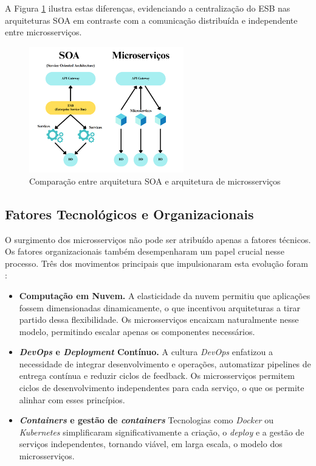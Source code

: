 A Figura \ref{fig:soa_microservicos} ilustra estas diferenças, evidenciando a centralização do ESB nas arquiteturas SOA em contraste com a comunicação distribuída e independente entre microsserviços.


\begin{figure}[H]
    \centering
    \includegraphics[width=0.6\textwidth]{images/Diagramas/soa_vs_microservicos.png}
    \caption{Comparação entre arquitetura SOA e arquitetura de microsserviços}
    \label{fig:soa_microservicos}
\end{figure}

\subsection{Fatores Tecnológicos e Organizacionais}

O surgimento dos microsserviços não pode ser atribuído apenas a fatores técnicos. Os fatores organizacionais também desempenharam um papel crucial nesse processo. Três dos movimentos principais que impulsionaram esta evolução foram \cite{Newman2015}:

\begin{itemize}
    \item \textbf{Computação em Nuvem.} A elasticidade da nuvem permitiu que aplicações fossem dimensionadas dinamicamente, o que incentivou arquiteturas a tirar partido dessa flexibilidade. Os microsserviços encaixam naturalmente nesse modelo, permitindo escalar apenas os componentes necessários.
    \item \textbf{\textit{DevOps} e \textit{Deployment} Contínuo.} A cultura \textit{DevOps} enfatizou a necessidade de integrar desenvolvimento e operações, automatizar pipelines de entrega contínua e reduzir ciclos de feedback. Os microsserviços permitem ciclos de desenvolvimento independentes para cada serviço, o que os permite alinhar com esses princípios.
    \item \textbf{\textit{Containers} e gestão de \textit{containers} } Tecnologias como \textit{Docker} ou \textit{Kubernetes} simplificaram significativamente a criação, o \textit{deploy} e a gestão de serviços independentes, tornando viável, em larga escala, o modelo dos microsserviços.
\end{itemize}

